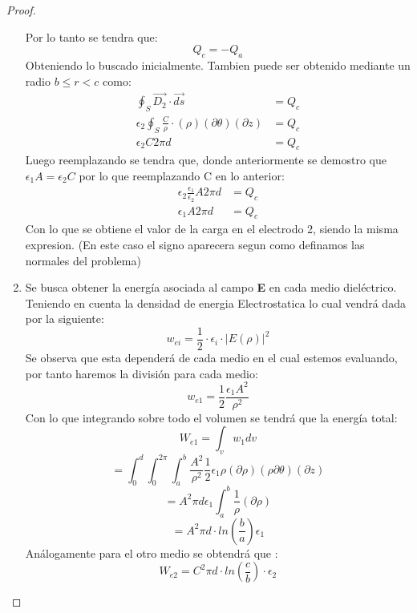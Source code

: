 \begin{proof}
\begin{enumerate}
    Por lo tanto se tendra que:
    \begin{equation}
        Q_{c} = -Q_{a}
    \end{equation}
    Obteniendo lo buscado inicialmente. Tambien puede ser obtenido mediante un radio $b \leq r < c$ como:
    \begin{align}
        \oint_{S} \vec{D_{2}} \cdot \vec{ds} &= Q_{c}\\  
        \epsilon_{2} \oint_{S} \frac{C}{\rho} \cdot (\rho) (\partial \theta) (\partial z) &= Q_{c}\\
        \epsilon_{2} C 2 \pi d &= Q_{c}
    \end{align}
    Luego reemplazando se tendra que, donde anteriormente se demostro que $\epsilon_{1}A = \epsilon_{2}C$ por lo que reemplazando C en lo anterior:
    \begin{align}
        \epsilon_{2} \frac{\epsilon_1}{\epsilon_2}A 2 \pi d &= Q_{c}\\
        \epsilon_{1} A 2 \pi d &= Q_{c}
    \end{align}
    Con lo que se obtiene el valor de la carga en el electrodo 2, siendo la misma expresion. (En este caso el signo aparecera segun como definamos las normales del problema)
    \item Se busca obtener la energía asociada al campo \textbf{E} en cada medio dieléctrico. Teniendo en cuenta la densidad de energia Electrostatica lo cual vendrá dada por la siguiente:
    \begin{equation}
        w_{ei} = \frac{1}{2}\cdot \epsilon_{i} \cdot |E(\rho)|^{2} 
    \end{equation}
    Se observa que esta dependerá de cada medio en el cual estemos evaluando, por tanto haremos la división para cada medio:
    \begin{equation}
        w_{e1} = \frac{1}{2}\frac{\epsilon_{1}A^{2}}{\rho^{2}}
    \end{equation}
    Con lo que integrando sobre todo el volumen se tendrá que la energía total:
    \begin{equation}
        W_{e1} =\int_{v} w_{1}dv
    \end{equation}
    \begin{equation}
        =\int_{0}^{d}  \int_{0}^{2\pi} \int_{a}^{b}\frac{A^{2}}{\rho^{2}} \frac{1}{2}\epsilon_{1} \rho(\partial\rho )(\rho \partial\theta)( \partial z)
    \end{equation}
    \begin{equation}
        = A^{2} \pi d\epsilon_{1} \int_{a}^{b} \frac{1}{\rho} (\partial\rho)
    \end{equation}
    \begin{equation}
        = A^{2}\pi  d \cdot ln\left(\frac{b}{a}\right) \epsilon_{1}
    \end{equation}
    Análogamente para el otro medio se obtendrá que :
    \begin{equation}
        W_{e2}= C^{2} \pi d \cdot ln\left(\frac{c}{b}\right) \cdot \epsilon_{2}
    \end{equation}
    \end{enumerate}
\end{proof}
\newpage

